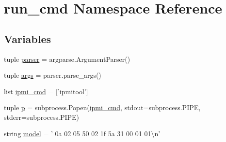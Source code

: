 \hypertarget{namespacerun__cmd}{\section{run\-\_\-cmd Namespace Reference}
\label{namespacerun__cmd}
}
\subsection*{Variables}
\begin{DoxyCompactItemize}
\item 
tuple \hyperlink{namespacerun__cmd_a4881756a760a58750fd91ab12871f48f}{parser} = argparse.\-Argument\-Parser()
\item 
tuple \hyperlink{namespacerun__cmd_ab32fce8f4b23146962d803fba46f8823}{args} = parser.\-parse\-\_\-args()
\item 
list \hyperlink{namespacerun__cmd_a867790f9a65754b460f8ddd598f77aef}{ipmi\-\_\-cmd} = \mbox{[}'ipmitool'\mbox{]}
\item 
tuple \hyperlink{namespacerun__cmd_a91a2d7f07be05bed4155bf0d9f0e12ed}{p} = subprocess.\-Popen(\hyperlink{namespacerun__cmd_a867790f9a65754b460f8ddd598f77aef}{ipmi\-\_\-cmd}, stdout=subprocess.\-P\-I\-P\-E, stderr=subprocess.\-P\-I\-P\-E)
\item 
string \hyperlink{namespacerun__cmd_a7669928154f8fad34ec31bccfbcbc114}{model} = ' 0a 02 05 50 02 1f 5a 31 00 01 01\textbackslash{}n'
\end{DoxyCompactItemize}


